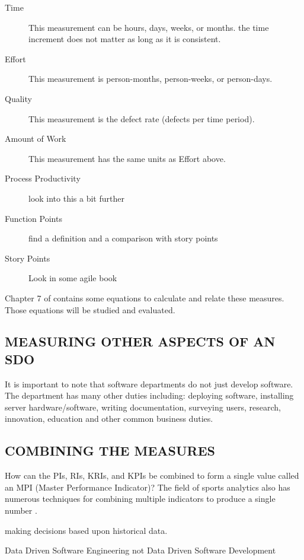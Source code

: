 \documentclass[SDSUThesis.tex]{subfiles}
\begin{document}
    \begin{description}
      \item[Time] This measurement can be hours, days, weeks, or months.  the time increment does not matter as long as it is consistent.
      \item[Effort] This measurement is person-months, person-weeks, or person-days.
      \item[Quality] This measurement is the defect rate (defects per time period).
      \item[Amount of Work] This measurement has the same units as Effort above. 
      \item[Process Productivity] look into this a bit further
      \item[Function Points] find a definition and a comparison with story points
      \item[Story Points] Look in some agile book
    \end{description}
    
    Chapter 7 of \cite{Putnam2013} contains some equations to calculate and relate
    these measures. Those equations will be studied and evaluated.


    \subsection{MEASURING OTHER ASPECTS OF AN SDO}
    
        It is important to note that software departments do not just
        develop software.  The department has many other duties
        including: deploying software, installing server hardware/software,
        writing documentation, surveying users, research, innovation,
        education and other common business duties.
    
    \subsection{COMBINING THE MEASURES}
    
        How can the PIs, RIs, KRIs, and KPIs be combined to form a single
        value called an MPI (Master Performance Indicator)?  The field
        of sports analytics also has numerous techniques for combining
        multiple indicators to produce a single number \cite{Cervone2014}.







making decisions based upon historical data.  

Data Driven Software Engineering not Data Driven Software Development
\end{document}
